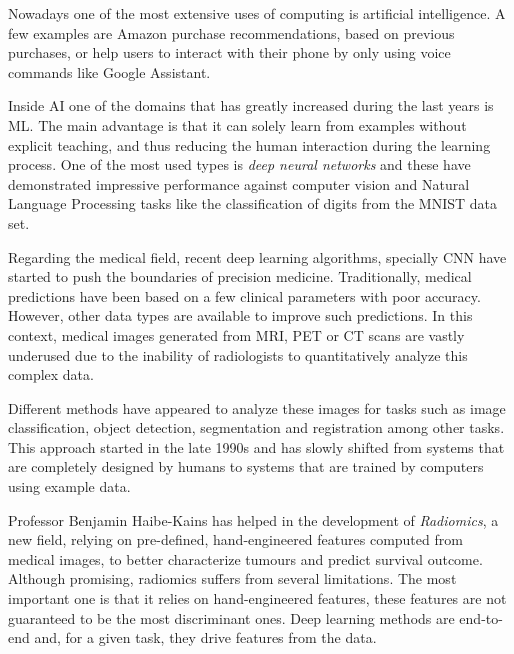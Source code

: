 

Nowadays one of the most extensive uses of computing is artificial intelligence. A few 
examples are Amazon purchase recommendations, based on previous purchases, or help users
to interact with their phone by only using voice commands like Google Assistant. 
~\cites{neural:amazon}{neural:google-assistant}

Inside AI one of the domains that has greatly increased during the last years is 
\gls{ML}. The main advantage is that it can solely learn from examples without 
explicit teaching, and thus reducing the human interaction during the learning process. One of the 
most used types is \emph{deep neural networks} and these have demonstrated impressive performance 
against computer vision and Natural Language Processing tasks like the classification of 
digits from the MNIST data set.
~\cites{neural:mnist}{neural:empirical-evaluation-deep-architectures}

Regarding the medical field, recent deep learning algorithms, specially \gls{CNN} 
have started to push the boundaries of precision medicine. 
Traditionally, medical predictions have been based on a few clinical parameters with poor accuracy.
However, other data types are available to improve such predictions. In this context, medical
images generated from \gls{MRI}, \gls{PET} or \gls{CT} scans are vastly underused 
due to the 
inability of radiologists to quantitatively analyze this complex data.

Different methods have appeared to analyze these images for tasks such as
image classification, object detection, segmentation and registration among other tasks. This
approach started in the late 1990s and has slowly shifted from systems that are completely designed
by humans to systems that are trained by computers using example data. 
~\cite{medical:survey-deep-learning}

Professor Benjamin Haibe-Kains has helped in the development of \emph{Radiomics}, a new field,
relying on pre-defined, hand-engineered features computed from medical images, to better 
characterize tumours and predict survival outcome. Although promising, radiomics suffers from 
several limitations. The most important one is that it relies on hand-engineered features,
these features are not guaranteed to be the most discriminant ones. Deep learning methods
are end-to-end and, for a given task, they drive features from the data.
~\cite{medical:radiomics-ml-classifiers}

